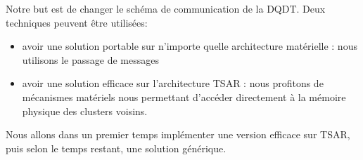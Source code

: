     Notre but est de changer le schéma de communication de la DQDT. Deux
    techniques peuvent être utilisées:
    \begin{itemize}
      \item avoir une solution portable sur n'importe quelle architecture
        matérielle : nous utilisons le passage de messages
      \item avoir une solution efficace sur l'architecture TSAR : nous profitons
        de mécanismes matériels nous permettant d'accéder directement à la
        mémoire physique des clusters voisins.
    \end{itemize}

    Nous allons dans un premier temps implémenter une version efficace sur TSAR,
    puis selon le temps restant, une solution générique.


